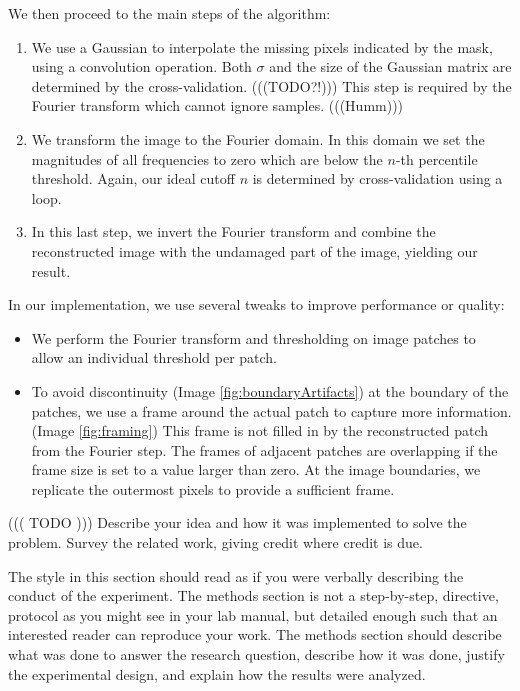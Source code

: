 \documentclass[10pt,conference,compsocconf]{IEEEtran}
\begin{document}
We then proceed to the main steps of the algorithm:
\begin{enumerate}
\label{algo}
\item \label{algo:step1}
We use a Gaussian to interpolate the missing pixels indicated by the mask, using a convolution operation. Both $\sigma$ and the size of the Gaussian matrix are determined by the cross-validation. (((TODO?!)))
This step is required by the Fourier transform which cannot ignore samples. (((Humm)))

\item \label{algo:step2}
We transform the image to the Fourier domain. In this domain we set the magnitudes of all frequencies to zero which are below the $n$-th percentile threshold. Again, our ideal cutoff $n$ is determined by cross-validation using a loop.

\item \label{algo:step3}
In this last step, we invert the Fourier transform and combine the reconstructed image with the undamaged part of the image, yielding our result.

\end{enumerate}

In our implementation, we use several tweaks to improve performance or quality:
\begin{itemize}
\item We perform the Fourier transform and thresholding on image patches to allow an individual threshold per patch.
\item To avoid discontinuity (Image \ref{fig:boundaryArtifacts}) at the boundary of the patches, we use a frame around the actual patch to capture more information. (Image \ref{fig:framing}) This frame is not filled in by the reconstructed patch from the Fourier step. The frames of adjacent patches are overlapping if the frame size is set to a value larger than zero. At the image boundaries, we replicate the outermost pixels to provide a sufficient frame.\end{itemize}
((( TODO )))
Describe your idea and how it was implemented to solve
  the problem. Survey the related work, giving credit where credit is
  due. 
  
  The style in this section should read as if you were verbally
describing the conduct of the experiment. 
The methods section is not a step-by-step, directive,
protocol as you might see in your lab manual, but detailed enough such
that an interested reader can reproduce your
work.
The methods
section should describe what was
done to answer the research question, describe how it was done,
justify the experimental design, and
explain how the results were analyzed.
\end{document}
